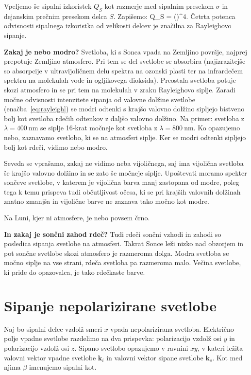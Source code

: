 Vpeljemo še sipalni izkoristek $Q_S$ kot razmerje med sipalnim presekom $\sigma$ in 
dejanskim prečnim presekom delca $S$. Zapišemo:
\beq
Q_S =  \propto {}\propto\left(\right)^4\!\!.
\label{eq:07_17}
\eeq
Četrta potenca odvisnosti sipalnega izkoristka od velikosti delcev je značilna za Rayleighovo sipanje.

\begin{example}{\bf Zakaj je nebo modro?}
Svetloba, ki s Sonca vpada na Zemljino površje, najprej prepotuje Zemljino atmosfero.
Pri tem se del svetlobe se absorbira (najizrazitejše so absorpcije v ultravijoličnem delu 
spektra na ozonski plasti ter na infrardečem spektru na molekulah vode in ogljikovega 
dioksida). Preostala svetloba potuje skozi atmosfero in se pri tem na molekulah v zraku
Rayleighovo siplje. Zaradi močne odvisnosti intenzitete sipanja od valovne dolžine svetlobe 
(enačba~\ref{eq:rayleigh}) se modri odtenki s krajšo valovno dolžino sipljejo bistveno bolj 
kot svetloba rdečih odtenkov z daljšo valovno dolžino. Na primer: svetloba z 
$\lambda = 400~\si{\nm}$ se siplje 16-krat močneje kot svetloba z $\lambda = 800~\si{\nm}$.
Ko opazujemo nebo, zaznavamo svetlobo, ki se na atmosferi siplje. Ker se modri odtenki sipljejo
bolj kot rdeči, vidimo nebo modro. 

Seveda se vprašamo, zakaj ne vidimo neba vijoličnega, saj 
ima vijolična svetloba še krajšo valovno dolžino in se zato še močneje siplje. Upoštevati 
moramo spekter sončeve svetlobe, v katerem je vijolična barva manj zastopana od modre, poleg
tega k temu prispeva tudi občutljivost očesa, ki se pri krajših valovnih dolžinah znatno 
zmanjša in vijolične barve ne zaznava tako močno kot modre. 

Na Luni, kjer ni atmosfere, je nebo povsem črno.
\end{example}

\begin{example}{\bf In zakaj je sončni zahod rdeč?}
Tudi rdeči sončni vzhodi in zahodi so posledica sipanja svetlobe na atmosferi. Takrat Sonce
leži nizko nad obzorjem in pot sončne svetlobe skozi atmosfero je razmeroma dolga.
Modra svetloba se močno siplje na vse strani, rdeča svetloba pa razmeroma malo. Večina
svetlobe, ki pride do opazovalca, je tako rdečkaste barve.
\end{example}

\section{Sipanje nepolarizirane svetlobe}
Naj bo sipalni delec vzdolž smeri $x$ vpada nepolarizirana svetloba. Električno
polje vpadne svetlobe razdelimo na dva prispevka: polarizacijo vzdolž osi $y$ in 
polarizacijo vzdolž osi $z$. Sipano svetlobo opazujemo v ravnini $xy$, v kateri
ležita valovni vektor vpadne svetlobe $\mathbf{k}_i$ in valovni vektor sipane svetlobe
$\mathbf{k}_s$. Kot med njima $\beta$ imenujemo sipalni kot.


